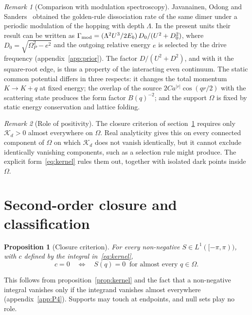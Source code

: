 \documentclass[12pt,a4paper]{article}
\newtheorem{proposition}{Proposition}
\theoremstyle{remark}
\newtheorem{remark}{Remark}
\newcommand{\Kd}{\mathcal{K}_d}
\begin{document}
\begin{remark}[Comparison with modulation spectroscopy]
Javanainen, Odong and Sanders~\cite{Javanainen2010} obtained the golden-rule dissociation rate of the same dimer under a periodic modulation of the hopping with depth $\Lambda$. In the present units their result can be written as $\Gamma_{\rm mod}=(\Lambda^2U^3/2E_b)\,D_0/(U^2+D_0^2)$, where $D_0=\sqrt{\Omega_P^2-e^2}$ and the outgoing relative energy $e$ is selected by the drive frequency (appendix~\ref{app:prior}). The factor $D/(U^2+D^2)$, and with it the square-root edge, is thus a property of the interacting even continuum. The static common potential differs in three respects: it changes the total momentum $K\to K+q$ at fixed energy; the overlap of the source $2Ca^{|r|}\cos(qr/2)$ with the scattering state produces the form factor $B(q)^{-2}$; and the support $\Omega$ is fixed by static energy conservation and lattice folding.
\end{remark}

\begin{remark}[Role of positivity]
The closure criterion of section~\ref{sec:closure} requires only $\Kd>0$ almost everywhere on $\Omega$. Real analyticity gives this on every connected component of $\Omega$ on which $\Kd$ does not vanish identically, but it cannot exclude identically vanishing components, such as a selection rule might produce. The explicit form~\eqref{eq:kernel} rules them out, together with isolated dark points inside $\Omega$.
\end{remark}

\section{Second-order closure and classification}\label{sec:closure}

\begin{proposition}[Closure criterion]\label{prop:closure}
For every non-negative $S\in L^1([-\pi,\pi))$, with $c$ defined by the integral in~\eqref{eq:kernel},
\begin{equation}\label{eq:closure}
c=0\quad\Longleftrightarrow\quad S(q)=0\ \text{ for almost every } q\in\Omega .
\end{equation}
\end{proposition}

This follows from proposition~\ref{prop:kernel} and the fact that a non-negative integral vanishes only if the integrand vanishes almost everywhere (appendix~\ref{app:P4}). Supports may touch at endpoints, and null sets play no role.
\end{document}
